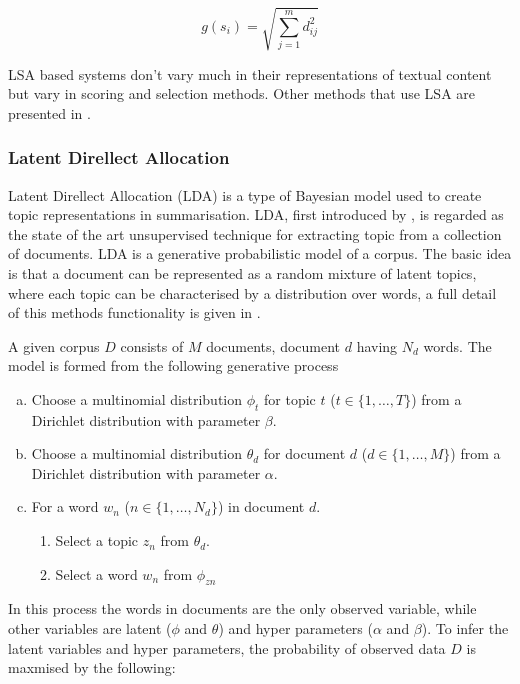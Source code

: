 \begin{equation}
      g(s_i) = \sqrt{\sum_{j=1}^m d_{ij}^2}
      \label{lsaEqu}
\end{equation}

LSA based systems don’t vary much in their representations of textual content but vary in scoring and selection methods. Other methods that use LSA are presented in \citep{hachey2006dimensionality,ozsoy2010text}.

\subsubsection{Latent Direllect Allocation}
Latent Direllect Allocation (LDA) is a type of Bayesian model used to create topic representations in summarisation. LDA, first introduced by \citet{blei2003latent}, is regarded as the state of the art unsupervised technique for extracting topic from a collection of documents. LDA is a generative probabilistic model of a corpus. The basic idea is that a document can be represented as a random mixture of latent topics, where each topic can be characterised by a distribution over words, a full detail of this methods functionality is given in \citep{blei2003latent,steyvers2007probabilistic}.

A given corpus $D$ consists of $M$ documents, document $d$ having $N_d$ words.
The model is formed from the following generative process

\begin{enumerate}[(a)]
      \item Choose a multinomial distribution $\phi_t$ for topic $t$ ($t \in \{1,\dots,T\}$) from a Dirichlet distribution with parameter $\beta$.
      \item Choose a multinomial distribution $\theta_d$ for document $d$ ($d \in \{1,\dots,M\}$) from a Dirichlet distribution with parameter $\alpha$.
      \item For a word $w_n$ ($n \in \{1,\dots,{N_d}\}$) in document $d$.
      \begin{enumerate}
            \item Select a topic $z_n$ from $\theta_d$.
            \item Select a word $w_n$ from $\phi_{zn}$
      \end{enumerate}
\end{enumerate}

In this process the words in documents are the only observed variable, while other variables are latent ($\phi$ and $\theta$) and hyper parameters ($\alpha$ and $\beta$). To infer the latent variables and hyper parameters, the probability of observed data $D$ is maxmised by the following:

